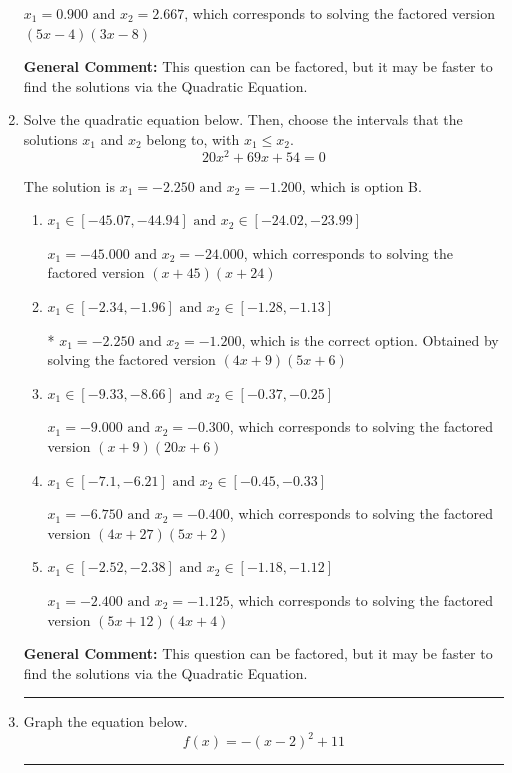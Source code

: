 \documentclass{extbook}[14pt]
\newcommand{\litem}[1]{\item #1

\rule{\textwidth}{0.4pt}}
\begin{document}
\begin{enumerate}
{\begin{enumerate}[label=\Alph*.]
$x_1 = 0.900 \text{ and } x_2 = 2.667$, which corresponds to solving the factored version $(5x -4)(3x -8)$
\end{enumerate}

\textbf{General Comment:} This question can be factored, but it may be faster to find the solutions via the Quadratic Equation.
}
\litem{
Solve the quadratic equation below. Then, choose the intervals that the solutions $x_1$ and $x_2$ belong to, with $x_1 \leq x_2$.
\[ 20x^{2} +69 x + 54 = 0 \]

The solution is \( x_1 = -2.250 \text{ and } x_2 = -1.200 \), which is option B.\begin{enumerate}[label=\Alph*.]
\item \( x_1 \in [-45.07, -44.94] \text{ and } x_2 \in [-24.02, -23.99] \)

$x_1 = -45.000 \text{ and } x_2 = -24.000$, which corresponds to solving the factored version $(x + 45)(x + 24)$
\item \( x_1 \in [-2.34, -1.96] \text{ and } x_2 \in [-1.28, -1.13] \)

* $x_1 = -2.250 \text{ and } x_2 = -1.200$, which is the correct option. Obtained by solving the factored version $(4x + 9)(5x + 6)$
\item \( x_1 \in [-9.33, -8.66] \text{ and } x_2 \in [-0.37, -0.25] \)

$x_1 = -9.000 \text{ and } x_2 = -0.300$, which corresponds to solving the factored version $(x + 9)(20x + 6)$
\item \( x_1 \in [-7.1, -6.21] \text{ and } x_2 \in [-0.45, -0.33] \)

$x_1 = -6.750 \text{ and } x_2 = -0.400$, which corresponds to solving the factored version $(4x + 27)(5x + 2)$
\item \( x_1 \in [-2.52, -2.38] \text{ and } x_2 \in [-1.18, -1.12] \)

$x_1 = -2.400 \text{ and } x_2 = -1.125$, which corresponds to solving the factored version $(5x + 12)(4x + 4)$
\end{enumerate}

\textbf{General Comment:} This question can be factored, but it may be faster to find the solutions via the Quadratic Equation.
}
\litem{
Graph the equation below.
\[ f(x) = -(x-2)^2 + 11 \]

}
\end{enumerate}
\end{document}
